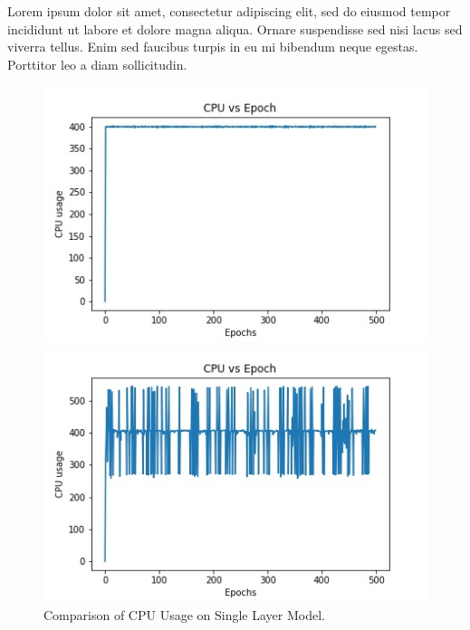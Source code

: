 \documentclass{cup-ino}
\begin{document}
Lorem ipsum dolor sit amet, consectetur adipiscing elit, sed do eiusmod tempor incididunt ut labore et dolore magna aliqua. Ornare suspendisse sed nisi lacus sed viverra tellus. Enim sed faucibus turpis in eu mi bibendum neque egestas. Porttitor leo a diam sollicitudin.

\begin{figure}[h!]
\begin{minipage}{0.47\textwidth}
\includegraphics[width=\linewidth]{images/single_gen_cpu.jpeg}
\end{minipage}
\hfill
\begin{minipage}{0.47\textwidth}
\includegraphics[width=\linewidth]{images/single_grad_cpu.jpeg}
\end{minipage}

\caption{Comparison of CPU Usage on Single Layer Model.}
\label{fig:singleCPU}
\end{figure}
\end{document}
